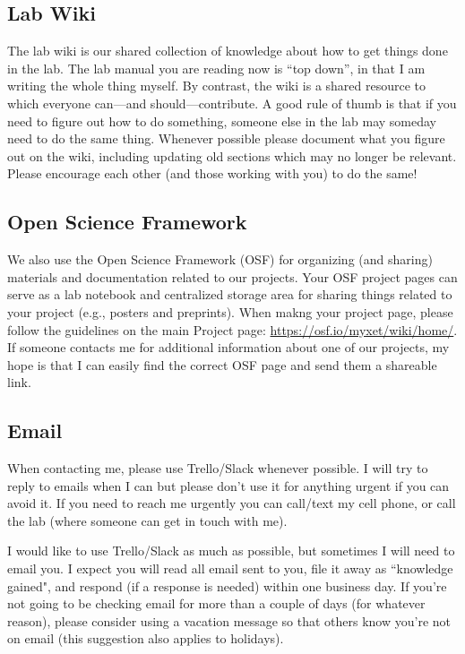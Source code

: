 \documentclass[letterpaper,12pt,oneside]{memoir}
\begin{document}
\subsection{Lab Wiki}

The lab wiki is our shared collection of knowledge about how to get things done in the lab. The lab manual you are reading now is ``top down'', in that I am writing the whole thing myself. By contrast, the wiki is a shared resource to which everyone can---and should---contribute. A good rule of thumb is that if you need to figure out how to do something, someone else in the lab may someday need to do the same thing. Whenever possible please document what you figure out on the wiki, including updating old sections which may no longer be relevant. Please encourage each other (and those working with you) to do the same!


\subsection{Open Science Framework}

We also use the Open Science Framework (OSF) for organizing (and sharing) materials and documentation related to our projects. Your OSF project pages can serve as a lab notebook and centralized storage area for sharing things related to your project (e.g., posters and preprints). When makng your project page, please follow the guidelines on the main Project page: \url{https://osf.io/myxet/wiki/home/}. If someone contacts me for additional information about one of our projects, my hope is that I can easily find the correct OSF page and send them a shareable link.


\subsection{Email}
When contacting me, please use Trello/Slack whenever possible. I will try to reply to emails when I can but please don't use it for anything urgent if you can avoid it. If you need to reach me urgently you can call/text my cell phone, or call the lab (where someone can get in touch with me). 

I would like to use Trello/Slack as much as possible, but sometimes I will need to email you. I expect you will read all email sent to you, file it away as ``knowledge gained", and respond (if a response is needed) within one business day. If you're not going to be checking email for more than a couple of days (for whatever reason), please consider using a vacation message so that others know you're not on email (this suggestion also applies to holidays).
\end{document}
